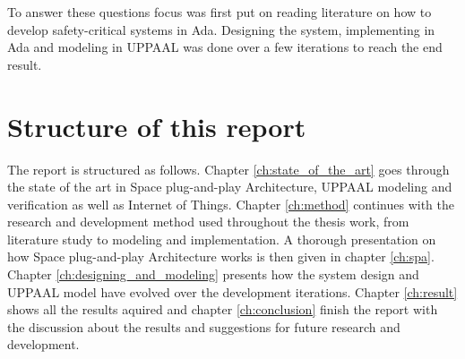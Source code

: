 To answer these questions focus was first put on reading literature on how
to develop safety-critical systems in Ada. Designing the system, implementing
in Ada and modeling in UPPAAL was done over a few iterations to reach the end
result.

\section{Structure of this report}
The report is structured as follows. Chapter \ref{ch:state_of_the_art} goes
through the state of the art in Space plug-and-play Architecture, UPPAAL
modeling and verification as well as Internet of Things.  Chapter
\ref{ch:method} continues with the research and development
method used throughout the thesis work, from literature study to modeling and
implementation. A thorough presentation on how Space plug-and-play Architecture
works is then given in chapter \ref{ch:spa}. Chapter
\ref{ch:designing_and_modeling} presents how the system design and UPPAAL
model have evolved over the development iterations. Chapter \ref{ch:result}
shows all the results aquired and chapter \ref{ch:conclusion} finish the report
with the discussion about the results and suggestions for future research and
development.

